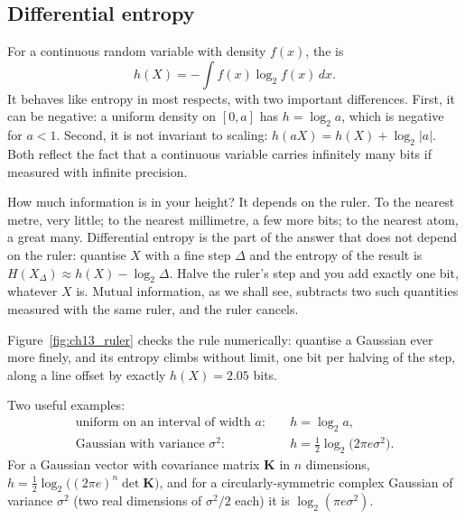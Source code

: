 \subsection{Differential entropy}

For a continuous random variable with density $f(x)$, the  is
\begin{equation}
h(X)=-\int f(x)\log_2f(x)\,dx.
\label{eq:ch13:diffent}
\end{equation}
It behaves like entropy in most respects, with two important differences. First, it can be
negative: a uniform density on $[0,a]$ has $h=\log_2a$, which is negative for $a<1$. Second, it is
not invariant to scaling: $h(aX)=h(X)+\log_2|a|$. Both reflect the fact that a continuous variable
carries infinitely many bits if measured with infinite precision.


\begin{analogy}
How much information is in your height? It depends on the ruler. To the nearest metre, very
little; to the nearest millimetre, a few more bits; to the nearest atom, a great many. Differential
entropy is the part of the answer that does not depend on the ruler: quantise $X$ with a fine step
$\Delta$ and the entropy of the result is $H(X_\Delta)\approx h(X)-\log_2\Delta$. Halve the ruler's
step and you add exactly one bit, whatever $X$ is. Mutual information, as we shall see, subtracts
two such quantities measured with the same ruler, and the ruler cancels.
\end{analogy}

Figure~\ref{fig:ch13_ruler} checks the rule numerically: quantise a Gaussian ever more finely, and
its entropy climbs without limit, one bit per halving of the step, along a line offset by exactly
$h(X)=2.05$ bits.

Two useful examples:
\begin{align}
\text{uniform on an interval of width }a:&\quad h=\log_2a,\\
\text{Gaussian with variance }\sigma^2:&\quad h=\tfrac12\log_2\!\big(2\pi e\sigma^2\big).
\label{eq:ch13:hgauss}
\end{align}
For a Gaussian vector with covariance matrix $\mathbf{K}$ in $n$ dimensions,
$h=\frac12\log_2\big((2\pi e)^n\det\mathbf{K}\big)$, and for a circularly-symmetric complex Gaussian
of variance $\sigma^2$ (two real dimensions of $\sigma^2/2$ each) it is $\log_2(\pi e\sigma^2)$.

